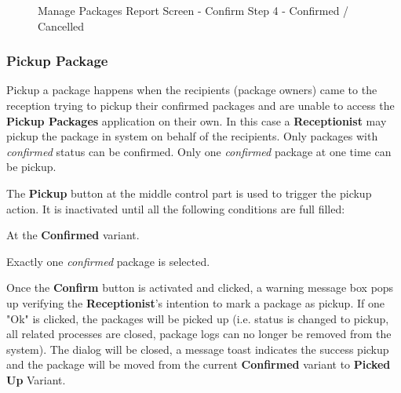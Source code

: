\begin{figure}[H]
	\centering
	\hspace{5pt}
    \caption{Manage Packages Report Screen - Confirm Step 4 - Confirmed / Cancelled}
	\label{fig:MPReportConfirmDlgButton}
\end{figure}

\subsubsection{Pickup Package}

Pickup a package happens when the recipients (package owners) came to the reception trying to pickup their confirmed packages and are unable to access the \textbf{Pickup Packages} application on their own. In this case a \textbf{Receptionist} may pickup the package in system on behalf of the recipients. Only packages with \textit{confirmed} status can be confirmed. Only one \textit{confirmed} package at one time can be pickup.

The \textbf{Pickup} button at the middle control part is used to trigger the pickup action. It is inactivated until all the following conditions are full filled:

\begin{compactenum}
    \item At the \textbf{Confirmed} variant.
    \item Exactly one \textit{confirmed} package is selected.
\end{compactenum}

\bigskip
Once the \textbf{Confirm} button is activated and clicked, a warning message box pops up verifying the \textbf{Receptionist}'s intention to mark a package as pickup. If one "Ok" is clicked, the packages will be picked up (i.e. status is changed to pickup, all related processes are closed, package logs can no longer be removed from the system). The dialog will be closed, a message toast indicates the success pickup and the package will be moved from the current \textbf{Confirmed} variant to \textbf{Picked Up} Variant.

